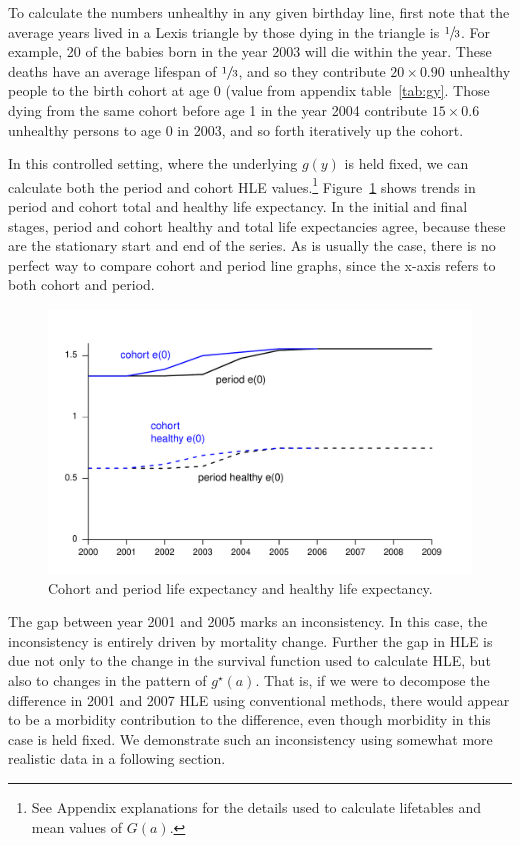 \documentclass[11pt,oneside,a4paper]{article} %
\begin{document}
To calculate the numbers unhealthy in any given birthday line, first note that
the average years lived in a Lexis triangle by those dying in the triangle is
$\sfrac{1}{3}$. For example, 20 of the
babies born in the year 2003 will die within the year. These deaths have an
average lifespan of $\sfrac{1}{3}$, and so they contribute $20\times0.90$ unhealthy
people to the birth cohort at age 0 (value from appendix table~\ref{tab:gy}.
Those dying from the same cohort before age 1 in the year 2004 contribute
$15\times0.6$ unhealthy persons to age 0 in 2003, and so forth iteratively up
the cohort.

In this controlled setting, where the underlying $g(y)$ is held fixed, we can
calculate both the period and cohort HLE values.\footnote{See Appendix
explanations for the details used to calculate lifetables and mean values of
$G(a)$. } Figure~\ref{fig:e0eHtoy} shows trends in period and cohort total and
healthy life expectancy. In the initial and final stages, period and cohort
healthy and total life expectancies agree, because these are the stationary
start and end of the series. As is usually the case, there is no perfect way to
compare cohort and period line graphs, since the x-axis refers to both cohort
and period. 

\begin{figure}
\begin{adjustwidth}{-1.5cm}{}
	\centering
	\includegraphics[scale=.6]{Figures/e0eHtoy.pdf}
	\caption{Cohort and period life expectancy and healthy life expectancy.}
	\label{fig:e0eHtoy}
\end{adjustwidth}
\end{figure}

The gap between year 2001 and 2005 marks an inconsistency. In
this case, the inconsistency is entirely driven by mortality change. Further the
gap in HLE is due not only to the change in the survival function used to
calculate HLE, but also to changes in the pattern of $g^\star(a)$. That is,
if we were to decompose the difference in 2001 and 2007 HLE using conventional
methods, there would appear to be a morbidity contribution to the difference,
even though morbidity in this case is held fixed. We demonstrate such an
inconsistency using somewhat more realistic data in a following section.
 
\end{document}
